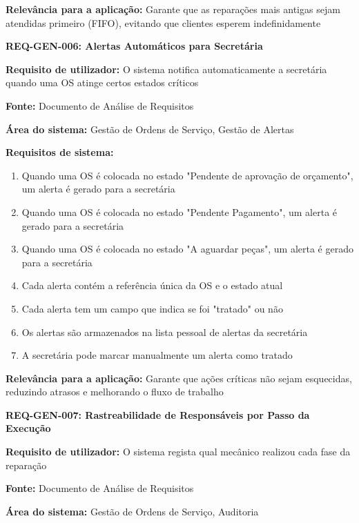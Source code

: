 \documentclass[11pt,a4paper]{article}
\newcommand{\reqheader}[1]{{\noindent\large\bfseries\color{sectionblue}#1}\par\vspace{0.3cm}}
\newcommand{\reqfield}[2]{{\noindent\textbf{#1:} #2}\par\vspace{0.2cm}}
\begin{document}
\reqfield{Relevância para a aplicação}{Garante que as reparações mais antigas sejam atendidas primeiro (FIFO), evitando que clientes esperem indefinidamente}

\vspace{0.8cm}

\reqheader{REQ-GEN-006: Alertas Automáticos para Secretária}

\reqfield{Requisito de utilizador}{O sistema notifica automaticamente a secretária quando uma OS atinge certos estados críticos}

\reqfield{Fonte}{Documento de Análise de Requisitos}

\reqfield{Área do sistema}{Gestão de Ordens de Serviço, Gestão de Alertas}

\reqfield{Requisitos de sistema}{
	\begin{enumerate}
		\item Quando uma OS é colocada no estado "Pendente de aprovação de orçamento", um alerta é gerado para a secretária
		\item Quando uma OS é colocada no estado "Pendente Pagamento", um alerta é gerado para a secretária
		\item Quando uma OS é colocada no estado "A aguardar peças", um alerta é gerado para a secretária
		\item Cada alerta contém a referência única da OS e o estado atual
		\item Cada alerta tem um campo que indica se foi "tratado" ou não
		\item Os alertas são armazenados na lista pessoal de alertas da secretária
		\item A secretária pode marcar manualmente um alerta como tratado
	\end{enumerate}
}

\reqfield{Relevância para a aplicação}{Garante que ações críticas não sejam esquecidas, reduzindo atrasos e melhorando o fluxo de trabalho}

\vspace{0.8cm}

\reqheader{REQ-GEN-007: Rastreabilidade de Responsáveis por Passo da Execução}

\reqfield{Requisito de utilizador}{O sistema regista qual mecânico realizou cada fase da reparação}

\reqfield{Fonte}{Documento de Análise de Requisitos}

\reqfield{Área do sistema}{Gestão de Ordens de Serviço, Auditoria}
\end{document}
